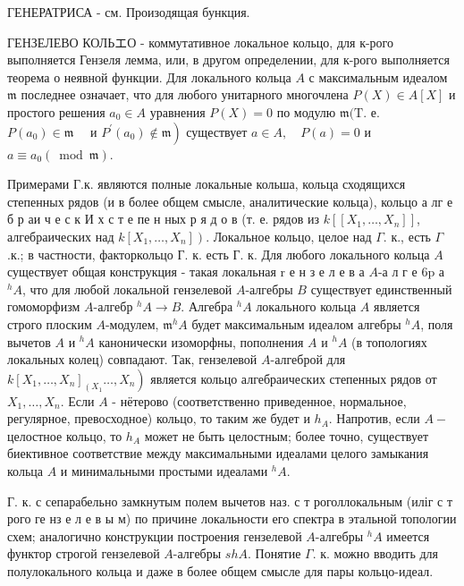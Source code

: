 \documentclass[10pt]{article}
\begin{document}
ГЕНЕРАТРИСА - см. Произодящая бункция.



ГЕНЗЕЛЕВО КОЛЬエО - коммутативное локальное кольцо, для к-рого выполняется Гензеля лемма, или, в другом определении, для к-рого выполняется теорема о неявной функции. Для локального кольца $A$ с максимальным идеалом $\mathfrak{m}$ последнее означает, что для любого унитарного многочлена $P(X) \in A[X]$ и простого решения $a_{0} \in A$ уравнения $P(X)=0$ по модулю $\mathfrak{m}(\mathrm{T}$. е. $P\left(a_{0}\right) \in \mathfrak{m} \quad$ и $\left.P^{\prime}\left(a_{0}\right) \notin \mathfrak{m}\right)$ существует $a \in A, \quad P(a)=0$ и $a \equiv a_{0}(\bmod \mathfrak{m})$.



Примерами Г.к. являются полные локальные кольша, кольца сходящихся степенных рядов (и в более общем смысле, аналитические кольца), кольцо а лг е б р аи ч е с к И х с т е пе н ных р я д о в (т. е. рядов из $k\left[\left[X_{1}, \ldots, X_{n}\right]\right]$, алгебраических над $\left.k\left[X_{1}, \ldots, X_{n}\right]\right)$. Локальное кольцо, целое над $\Gamma$. к., есть $\Gamma$.к.; в частности, факторкольцо Г. к. есть Г. к. Для любого локального кольца $A$ существует общая конструкция - такая локальная $\mathrm{r}$ е н з е л е в а $A$-а л г е $6 \mathrm{p}$ а ${ }^{h} A$, что для любой локальной гензелевой $A$-алгебры $B$ существует единственный гомоморфизм $A$-алгебр ${ }^{h} A \rightarrow B$. Алгебра ${ }^{h} A$ локального кольца $A$ является строго плоским $A$-модулем, $\mathfrak{m}^{h} A$ будет максимальным идеалом алгебры ${ }^{h} A$, поля вычетов $A$ и ${ }^{h} A$ канонически изоморфны, пополнения $A$ и ${ }^{h} A$ (в топологиях локальных колец) совпадают. Так, гензелевой $A$-алгеброй для $\left.k\left[X_{1}, \ldots, X_{n}\right]_{\left(X_{1}\right.} \ldots, X_{n}\right)$ является кольцо алгебраических степенных рядов от $X_{1}, \ldots, X_{n}$. Если $A$ - нётерово (соответственно приведенное, нормальное, регулярное, превосходное) кольцо, то таким же будет и $h_{A}$. Напротив, если $A-$ целостное кольцо, то $h_{A}$ может не быть целостным; более точно, существует биективное соответствие между максимальными идеалами целого замыкания кольца $A$ и минимальными простыми идеалами ${ }^{h} A$.



Г. к. с сепарабельно замкнутым полем вычетов наз. с т роголлокальным (иліг с т рого ге нз е л е в ы м) по причине локальности его спектра в этальной топологии схем; аналогично конструкции построения гензелевой $A$-алгебры ${ }^{h} A$ имеется функтор строгой гензелевой $A$-алгебры $s h A$. Понятие $\Gamma$. к. можно вводить для полулокального кольца и даже в более общем смысле для пары кольцо-идеал.
\end{document}
